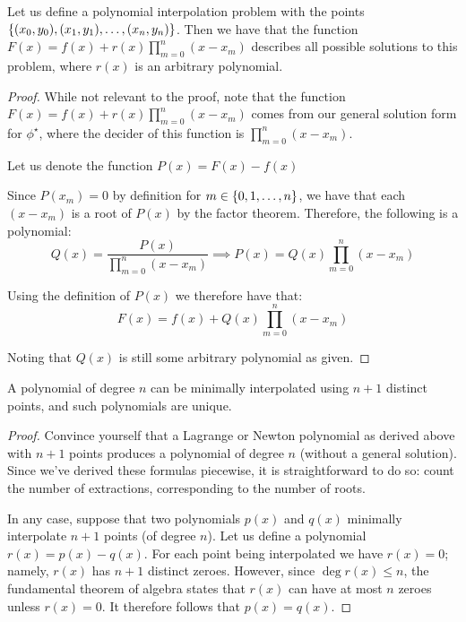 \begin{theorem}
    Let us define a polynomial interpolation problem with the points $\{(x_0,y_0),(x_1,y_1),\dots,(x_n,y_n)\}$. Then we have that the function $F(x)=f(x)+r(x)\prod_{m=0}^{n}{(x-x_m)}$ describes all possible solutions to this problem, where $r(x)$ is an arbitrary polynomial.

    \begin{proof}
        While not relevant to the proof, note that the function $F(x)=f(x)+r(x)\prod_{m=0}^{n}{(x-x_m)}$ comes from our general solution form for $\phi^\star$, where the decider of this function is $\prod_{m=0}^{n}{(x-x_m)}$.

        Let us denote the function $P(x)=F(x)-f(x)$

        Since $P(x_m)=0$ by definition for $m\in\{0,1,\dots,n\}$, we have that each $(x-x_m)$ is a root of $P(x)$ by the factor theorem. Therefore, the following is a polynomial:
        $$
            Q(x)=\frac{P(x)}{\prod_{m=0}^{n}{(x-x_m)}}\implies P(x)=Q(x)\prod_{m=0}^{n}{(x-x_m)}
        $$

        Using the definition of $P(x)$ we therefore have that:
        $$
            F(x)=f(x)+Q(x)\prod_{m=0}^{n}{(x-x_m)}
        $$

        Noting that $Q(x)$ is still some arbitrary polynomial as given.
    \end{proof}
\end{theorem}

\begin{theorem}
    A polynomial of degree $n$ can be minimally interpolated using $n+1$ distinct points, and such polynomials are unique.

    \begin{proof}
        Convince yourself that a Lagrange or Newton polynomial as derived above with $n+1$ points produces a polynomial of degree $n$ (without a general solution). Since we've derived these formulas piecewise, it is straightforward to do so: count the number of extractions, corresponding to the number of roots.

        In any case, suppose that two polynomials $p(x)$ and $q(x)$ minimally interpolate $n+1$ points (of degree $n$). Let us define a polynomial $r(x)=p(x)-q(x)$. For each point being interpolated we have $r(x)=0$; namely, $r(x)$ has $n+1$ distinct zeroes. However, since $\deg{r(x)}\leq n$, the fundamental theorem of algebra states that $r(x)$ can have at most $n$ zeroes unless $r(x)=0$. It therefore follows that $p(x)=q(x)$.
    \end{proof}
\end{theorem}

